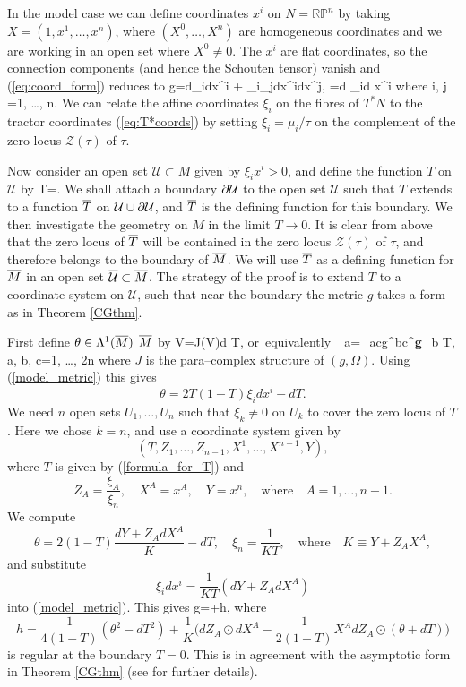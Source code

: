 In the model case we can define coordinates $x^i$ on $N=\mathbb{RP}^n$ by taking $X=(1,x^1,\dots,x^n)$, where $(X^0,\dots,X^n)$ are homogeneous coordinates and we are working in an open set where $X^0\neq 0$. The ${x^i}$ are flat coordinates, so the connection components (and hence the Schouten tensor) vanish and (\ref{eq:coord_form}) reduces to
\be
\label{model_metric}
g=d\xi_i\odot dx^i + \xi_i\xi_jdx^i\odot dx^j, \qquad
\Omega=d \xi_i\wedge d x^i \quad
\mbox{where}\quad
i, j =1, \dots, n.
\ee
We can relate \cite{DM} the affine coordinates $\xi_i$ on the fibres of $T^*N$ to the tractor coordinates (\ref{eq:T*coords}) by setting $\xi_i=\mu_i/\tau$ on the complement of the zero locus ${\mathcal Z}(\tau)$ of $\tau$.

Now consider an open set  ${\mathcal U}\subset M$ given
by  $\xi_ix^i>0$, and define the function $T$ on ${\mathcal U}$ by
\be
\label{formula_for_T}
T=.
\ee
We shall attach a boundary  $\partial \mathcal{U}$ to the open set $\mathcal{U}$ 
such that $T$ extends to a function $\overline{T}$ on $\mathcal{U}\cup \partial \mathcal{U}$, and
$\overline{T}$ is  the defining function for this boundary.
We then investigate the geometry on $M$ in the limit $T\rightarrow 0$.
It is clear from above that
the zero locus of $\overline{T}$ will be contained in the zero locus $\mathcal{Z}(\tau)$ of $\tau$, and
therefore belongs to the boundary of $\overline{M}$. We will 
use $\overline{T}$ as a defining function for $\overline{M}$ in an open set $\overline{\mathcal{U}}\subset\overline{M}$.
The strategy of the proof is to extend $T$ to a coordinate system on 
$\mathcal{U}$, such that near the boundary the metric $g$ takes a form
as in Theorem \ref{CGthm}.


First define $\theta\in \Lambda^1(\overline{M})$ $\overline{M}$
by 
\be
\label{def_theta}
V\hook \theta=J(V)\hook d T, \quad\mbox{or equivalently}\quad 
\theta_a=\Omega_{ac}g^{bc}{{\nabla}^{\bf g}}_b T, \quad a, b, c=1, \dots, 2n
\ee
where $J$ is the para--complex structure of $(g,  \Omega)$. Using (\ref{model_metric}) this  gives
\[
\theta=2T(1-T)\xi_id x^i-dT.
\]
We need $n$  open sets $U_1, \dots, U_n$ such that $\xi_k\neq 0$ on $U_k$
to cover the zero locus of $T$. Here we chose $k=n$, and use
a coordinate system given by
\[
(T, Z_1, \dots, Z_{n-1}, X^1, \dots,
 X^{n-1}, Y),
\] 
where $T$ is
given by (\ref{formula_for_T}) and
\[
Z_A=\frac {\xi_A}{\xi_n}, \quad X^A=x^A, \quad Y=x^{n}, \quad\mbox{where}\quad
A=1, \dots, n-1.
\]
We compute
\[
\theta=2(1-T)\frac{dY+Z_AdX^A}{K}-dT, \quad
\xi_n=\frac{1}{KT}, \quad \mbox{where}\quad K\equiv Y+Z_AX^A,
\]
and substitute
\[
\xi_i dx^i=\frac{1}{KT}(dY+Z_AdX^A)
\]
into (\ref{model_metric}). This gives
\be
\label{CG_Form}
g=+h,
\ee
where 
\[
h=\frac{1}{4(1-T)}(\theta^2-dT^2)+\frac{1}{K}\Big(dZ_A\odot dX^A-\frac{1}{2(1-T)}X^A dZ_A\odot(\theta+dT)\Big)
\]
is regular at the boundary $T=0$. This is in agreement with the 
asymptotic form in Theorem \ref{CGthm} (see \cite{CG} for further details).

